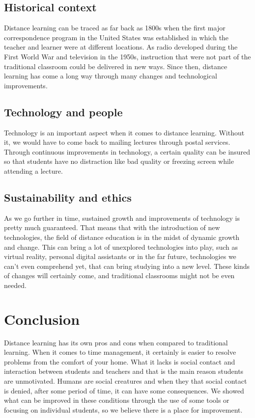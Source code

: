 \documentclass[10pt,twoside,english,a4paper]{article}
\begin{document}
\subsection{Historical context}
Distance learning can be traced as far back as 1800s when the first major correspondence program in the United States was established in which the teacher and learner were at different locations.\cite{historyofdistancelearning} As radio developed during the First World War and television in the 1950s, instruction that were not part of the traditional classroom could be delivered in new ways.\cite{historyofdistancelearning} Since then, distance learning has come a long way through many changes and technological improvements.
\subsection{Technology and people}
Technology is an important aspect when it comes to distance learning. Without it, we would have to come back to mailing lectures through postal services. Through continuous improvements in technology, a certain quality can be insured so that students have no distraction like bad quality or freezing screen while attending a lecture.
\subsection{Sustainability and ethics}
As we go further in time, sustained growth and improvements of technology is pretty much guaranteed. That means that with the introduction of new technologies, the field of distance education is in the midst of dynamic growth and change. This can bring a lot of unexplored technologies into play, such as virtual reality, personal digital assistants or in the far future, technologies we can't even comprehend yet\cite{historyofdistancelearning}, that can bring studying into a new level. These kinds of changes will certainly come, and traditional classrooms might not be even needed.
\section{Conclusion}
Distance learning has its own pros and cons when compared to traditional learning. When it comes to time management, it certainly is easier to resolve problems from the comfort of your home. What it lacks is social contact and interaction between students and teachers and that is the main reason students are unmotivated. Humans are social creatures and when they that social contact is denied, after some period of time, it can have some consequences. We showed what can be improved in these conditions through the use of some tools or focusing on individual students, so we believe there is a place for improvement.

\newpage

 
\end{document}
